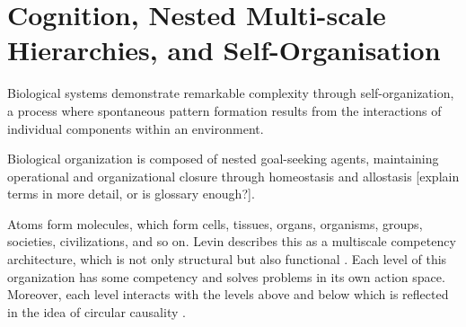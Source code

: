 




\section{Cognition, Nested Multi-scale Hierarchies, and Self-Organisation}

Biological systems demonstrate remarkable complexity through self-organization, a process where spontaneous pattern formation results from the interactions of individual components within an environment. 

Biological organization is composed of nested goal-seeking agents, maintaining operational and organizational closure through homeostasis and allostasis \cite{ciaunica_nested_2023, vernon_embodied_2015} [explain terms in more detail, or is glossary enough?].

Atoms form molecules, which form cells, tissues, organs, organisms, groups, societies, civilizations, and so on. Levin describes this as a multiscale competency architecture, which is not only structural but also functional \cite{Levin_2023}. Each level of this organization has some competency and solves problems in its own action space. Moreover, each level interacts with the levels above and below which is reflected in the idea of circular causality \cite{ciaunica_nested_2023, vernon_embodied_2015}. 







